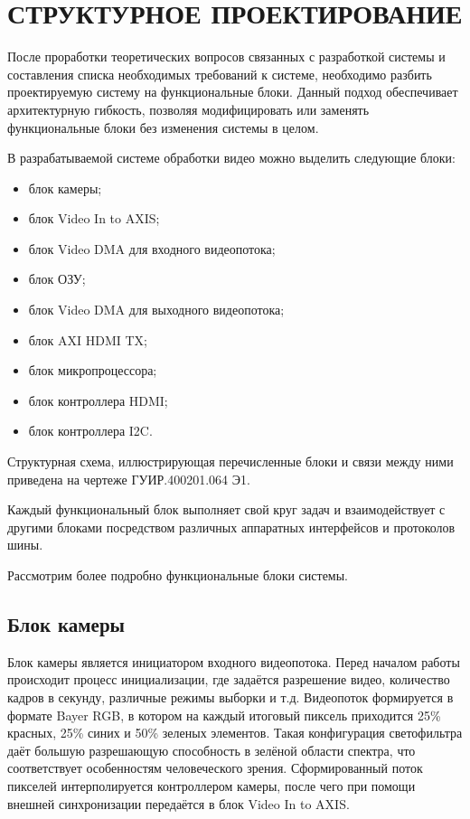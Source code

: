 \section{СТРУКТУРНОЕ ПРОЕКТИРОВАНИЕ}
\label{sec:structural}

После проработки теоретических вопросов связанных с разработкой системы и
составления списка необходимых требований к системе, необходимо разбить проектируемую систему
на функциональные блоки. Данный подход обеспечивает архитектурную гибкость, позволяя
модифицировать или заменять функциональные блоки без изменения системы в целом.

В разрабатываемой системе обработки видео можно выделить следующие блоки:

\begin{itemize}
  \item блок камеры;
  \item блок Video In to AXIS;
  \item блок Video DMA для входного видеопотока;
  \item блок ОЗУ;
  \item блок Video DMA для выходного видеопотока;
  \item блок AXI HDMI TX;
  \item блок микропроцессора;
  \item блок контроллера HDMI;
  \item блок контроллера I2C.
\end{itemize}

Структурная схема, иллюстрирующая перечисленные блоки и связи
между ними приведена на чертеже ГУИР.400201.064 Э1.

Каждый функциональный блок выполняет свой круг задач и взаимодействует с другими блоками
посредством различных аппаратных интерфейсов и протоколов шины.

Рассмотрим более подробно функциональные блоки системы.

\subsection{Блок камеры}
\label{sec:structural:camera}

Блок камеры является инициатором входного видеопотока. Перед началом работы происходит
процесс инициализации, где задаётся разрешение видео, количество кадров в секунду,
различные режимы выборки и т.д. Видеопоток формируется в формате Bayer RGB, в котором
на каждый итоговый пиксель приходится 25\% красных, 25\% синих и 50\% зеленых элементов.
Такая конфигурация светофильтра даёт большую разрешающую способность в зелёной области спектра,
что соответствует особенностям человеческого зрения. Сформированный поток пикселей интерполируется
контроллером камеры, после чего при помощи внешней синхронизации передаётся в блок Video In to AXIS.

